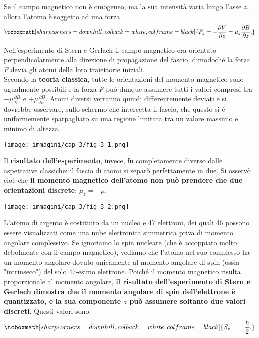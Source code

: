 \documentclass[a4paper,12pt,oneside]{book}
\begin{document}
Se il campo magnetico non è omogeneo, ma la sua intensità varia lungo l'asse $z$, allora l'atomo è soggetto ad una forza
	\begin{equation}
		\tcboxmath[sharp corners=downhill, colback=white, colframe=black]{		
			F_z= - \frac{\partial V}{\partial z}= \mu_z\frac{\partial B}{\partial z} .
			}
\end{equation}

Nell'esperimento di Stern e Gerlach il campo magnetico era orientato perpendicolarmente alla direzione di propagazione del fascio, dimodoché la forza \emph{F} devia gli atomi della loro traiettorie iniziali.\\

Secondo la \textbf{teoria classica}, tutte le orientazioni del momento magnetico sono ugualmente possibili e la forza \emph{F} può dunque assumere tutti i valori compresi tra $-\mu \frac{\partial B}{\partial z}$ e $+\mu \frac{\partial B}{\partial z}$. Atomi diversi verranno quindi differentemente deviati e si dovrebbe osservare, sullo schermo che intercetta il fascio, che questo si è uniformemente sparpagliato su una regione limitata tra un valore massimo e minimo di altezza.
\begin{center}
\texttt{[image: immagini/cap\_3/fig\_3\_1.png]}
\end{center}
Il \textbf{risultato dell'esperimento}, invece, fu completamente diverso dalle aspettative classiche: il fascio di atomi si separò perfettamente in due. Si osservò cioè che \textbf{il momento magnetico dell'atomo non può prendere che due orientazioni discrete}: $\mu_z=\pm \mu $.\\
\begin{center}
\texttt{[image: immagini/cap\_3/fig\_3\_2.png]}
\end{center}

L'atomo di argento è costituito da un nucleo e 47 elettroni, dei quali 46 possono essere visualizzati come una nube elettronica simmetrica priva di momento angolare complessivo. Se ignoriamo lo spin nucleare (che è accoppiato molto debolmente con il campo magnetico), vediamo che l'atomo nel suo complesso ha un momento angolare dovuto unicamente al momento angolare di spin (ossia "intrinseco") del solo 47-esimo elettrone. Poiché il momento magnetico risulta proporzionale al momento angolare, \textbf{il risultato dell'esperimento di Stern e Gerlach dimostra che il momento angolare di spin dell'elettrone è quantizzato, e la sua componente $z$ può assumere soltanto due valori discreti}. Questi valori sono:
	\begin{equation}
		\tcboxmath[sharp corners=downhill, colback=white, colframe=black]{
			S_z= \pm \frac{\hbar}{2}.
			}
	\end{equation} 
\end{document}
